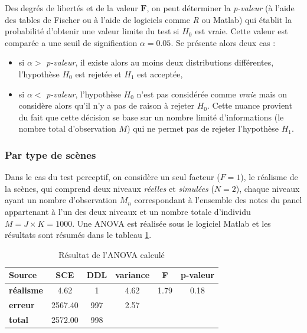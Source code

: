 Des degrés de libertés et de la valeur $\mathbf{F}$, on peut déterminer la \textit{p-valeur} (à l'aide des tables de Fischer ou à l'aide de logiciels comme \textit{R} ou Matlab) qui établit la probabilité d'obtenir une valeur limite du test si $H_0$ est vraie. Cette valeur est comparée a une seuil de signification $\alpha = 0.05$. Se présente alors deux cas :
 
\begin{itemize}
\item si $\alpha >$ \textit{p-valeur}, il existe alors au moins deux distributions différentes, l'hypothèse $H_0$ est rejetée et $H_1$ est acceptée,
\item si $\alpha <$ \textit{p-valeur}, l'hypothèse $H_0$ n'est pas considérée comme \textit{vraie} mais on considère alors qu'il n'y a pas de raison à rejeter $H_0$. Cette nuance provient du fait que cette décision se base sur un nombre limité d'informations (le nombre total d'observation $M$) qui ne permet pas de rejeter l'hypothèse $H_1$.\\
\end{itemize} 

\subsubsection{Par type de scènes}

Dans le cas du test perceptif, on considère un seul facteur ($F = 1$), le réalisme de la scènes, qui comprend deux niveaux \textit{réelles} et \textit{simulées} ($N = 2$), chaque niveaux ayant un nombre d'observation $M_n$ correspondant à l'ensemble des notes du panel appartenant à l'un des deux niveaux et un nombre totale d'individu $M = J \times K = 1000$. Une ANOVA est réalisée sous le logiciel Matlab et les résultats sont résumés dans le tableau \ref{tab:anova}.\\

\begin{table}[ht]
\centering
\begin{tabular}{lccccc}
\hline
\textbf{Source}     & \textbf{SCE} & \textbf{DDL} & \textbf{variance} & \textbf{F} & \textbf{p-valeur} \\
\hline
\textbf{réalisme} & 4.62         & 1            & 4.62              & 1.79       & 0.18              \\
\hline
\textbf{erreur}      & 2567.40      & 997          & 2.57              &            &                   \\
\hline
\textbf{total}      & 2572.00         & 998          &                   &            &       \\
\hline
\end{tabular}
\caption{Résultat de l'ANOVA calculé}
\label{tab:anova}
\end{table}


